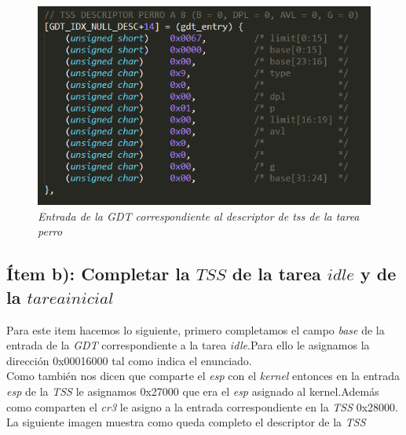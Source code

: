 \begin{figure}[H]
\begin{center}
\includegraphics[width=\linewidth]{ejercicio6/gdt_perro.png}
\caption{{\small \textit{Entrada de la \textit{GDT} correspondiente al descriptor de tss de la tarea perro }}}
\endminipage
\end{center}
\end{figure}


\subsection{Ítem b): Completar la $TSS$ de la tarea $idle$ y de la $tarea inicial$}
Para este item hacemos lo siguiente, primero completamos el campo \textit{base} de la entrada de la \textit{GDT} correspondiente a la tarea \textit{idle}.Para ello le asignamos la dirección 0x00016000 tal como indica el enunciado.\\
Como también nos dicen que comparte el \textit{esp} con el \textit{kernel} entonces en la entrada \textit{esp} de la \textit{TSS} le asignamos 0x27000 que era el \textit{esp} asignado al kernel.Además como comparten el \textit{cr3} le asigno a la entrada correspondiente en la \textit{TSS} 0x28000.\\%
La siguiente imagen muestra como queda completo el descriptor de la \textit{TSS}\\

